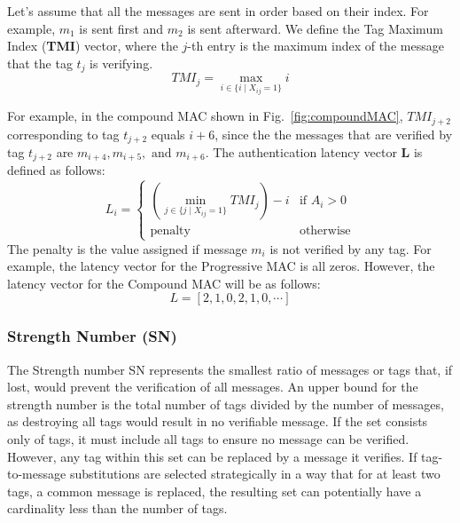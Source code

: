 Let's assume that all the messages are sent in order based on their index. For example, \( m_1 \) is sent first and \( m_2 \) is sent afterward. We define the Tag Maximum Index (\textbf{TMI}) vector, where the \( j \)-th entry is the maximum index of the message that the tag \( t_j \) is verifying.
\begin{equation}
	TMI_j= \max_{i \in \{i \mid X_{ij} = 1\}} i 
\end{equation}

For example, in the compound MAC shown in Fig.~\ref{fig:compoundMAC}, \( TMI_{j+2} \) corresponding to tag \( t_{j+2} \) equals \( i+6 \), since the the messages that are verified by tag \( t_{j+2} \) are \( m_{i+4}, m_{i+5}, \text{ and } m_{i+6}\).
The authentication latency vector \( \textbf{L} \) is defined as follows:
\begin{equation}
	L_i = 
	\begin{cases} 
		\left(\min_{j \in \{j \mid X_{ij}=1 \}} TMI_j \right)-i & \text{if } A_i > 0 \\
		\text{penalty} & \text{otherwise}
	\end{cases}
\end{equation}
The penalty is the value assigned if message \( m_i \) is not verified by any tag. For example, the latency vector for the Progressive MAC is all zeros. However, the latency vector for the Compound MAC will be as follows:
$$L = [2, 1, 0, 2, 1, 0, \cdots]$$

\subsubsection{Strength Number (SN)}
The Strength number SN represents the smallest ratio of messages or tags that, if lost, would prevent the verification of all messages. An upper bound for the strength number is the total number of tags divided by the number of messages, as destroying all tags would result in no verifiable message. If the set consists only of tags, it must include all tags to ensure no message can be verified. However, any tag within this set can be replaced by a message it verifies. If tag-to-message substitutions are selected strategically in a way that for at least two tags, a common message is replaced, the resulting set can potentially have a cardinality less than the number of tags.

